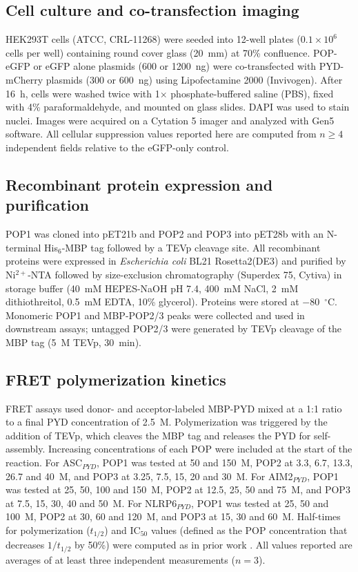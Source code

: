 \documentclass[11pt]{article}
\begin{document}
\subsection{Cell culture and co-transfection imaging}

HEK293T cells (ATCC, CRL-11268) were seeded into 12-well plates
($0.1 \times 10^{6}$ cells per well) containing round cover glass
(20~mm) at 70\% confluence. POP-eGFP or eGFP alone plasmids (600 or
1200~ng) were co-transfected with PYD-mCherry plasmids (300 or 600~ng)
using Lipofectamine 2000 (Invivogen). After 16~h, cells were washed twice
with 1$\times$ phosphate-buffered saline (PBS), fixed with 4\%
paraformaldehyde, and mounted on glass slides. DAPI was used to stain
nuclei. Images were acquired on a Cytation 5 imager and analyzed with
Gen5 software. All cellular suppression values reported here are
computed from $n \geq 4$ independent fields relative to the eGFP-only
control.

\subsection{Recombinant protein expression and purification}

POP1 was cloned into pET21b and POP2 and POP3 into pET28b with an
N-terminal His$_6$-MBP tag followed by a TEVp cleavage site. All
recombinant proteins were expressed in \emph{Escherichia coli} BL21
Rosetta2(DE3) and purified by Ni$^{2+}$-NTA followed by size-exclusion
chromatography (Superdex 75, Cytiva) in storage buffer
(40~mM HEPES-NaOH pH 7.4, 400~mM NaCl, 2~mM dithiothreitol,
0.5~mM EDTA, 10\% glycerol). Proteins were stored at $-80$~$^{\circ}$C.
Monomeric POP1 and MBP-POP2/3 peaks were collected and used in downstream
assays; untagged POP2/3 were generated by TEVp cleavage of the MBP tag
(5~\textmu M TEVp, 30~min).

\subsection{FRET polymerization kinetics}

FRET assays used donor- and acceptor-labeled MBP-PYD mixed at a 1:1 ratio
to a final PYD concentration of 2.5~\textmu M. Polymerization was triggered
by the addition of TEVp, which cleaves the MBP tag and releases the PYD for
self-assembly. Increasing concentrations of each POP were included at the
start of the reaction. For ASC$_{PYD}$, POP1 was tested at 50 and 150~\textmu M,
POP2 at 3.3, 6.7, 13.3, 26.7 and 40~\textmu M, and POP3 at 3.25, 7.5, 15, 20
and 30~\textmu M. For AIM2$_{PYD}$, POP1 was tested at 25, 50, 100 and
150~\textmu M, POP2 at 12.5, 25, 50 and 75~\textmu M, and POP3 at 7.5, 15,
30, 40 and 50~\textmu M. For NLRP6$_{PYD}$, POP1 was tested at 25, 50 and
100~\textmu M, POP2 at 30, 60 and 120~\textmu M, and POP3 at 15, 30 and
60~\textmu M. Half-times for polymerization ($t_{1/2}$) and IC$_{50}$ values
(defined as the POP concentration that decreases $1/t_{1/2}$ by 50\%) were
computed as in prior work \citep{matyszewski2018digital,
matyszewski2021distinct}. All values reported are averages of at least
three independent measurements ($n = 3$).
\end{document}
